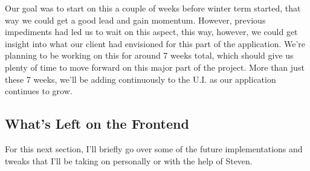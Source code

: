 \documentclass[onecolumn, draftclsnofoot,10pt, compsoc]{IEEEtran}
\begin{document}
Our goal was to start on this a couple of weeks before winter term started, that way we could
get a good lead and gain momentum. However, previous impediments had led us to wait on this
aspect, this way, however, we could get insight into what our client had envisioned for this
part of the application. We’re planning to be working on this for around 7 weeks total, which
should give us plenty of time to move forward on this major part of the project. More than
just these 7 weeks, we’ll be adding continuously to the U.I. as our application continues to
grow.

\subsection{What's Left on the Frontend}

For this next section, I'll briefly go over some of the future implementations and tweaks that
I'll be taking on personally or with the help of Steven.
\end{document}
